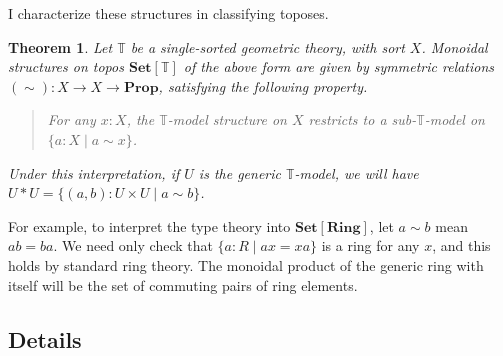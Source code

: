\documentclass{article}
\newtheorem{theorem}{Theorem}[section]
\newcommand*{\Prop}{\mathbf{Prop}}
\newcommand*{\Set}{\mathbf{Set}}
\newcommand*{\Ring}{\mathbf{Ring}}
\newcommand*{\T}{\mathbb{T}}
\begin{document}
I characterize these structures in classifying toposes.

\begin{theorem}
    Let \(\T\) be a single-sorted geometric theory, with sort \(X\).
    Monoidal structures on topos \(\Set[\T]\) of the above form 
    are given by symmetric relations \((\sim) : X \to X \to \Prop\),
    satisfying the following property.
    \begin{quote}
        For any \(x : X\), the \(\T\)-model structure on \(X\)
        restricts to a sub-\(\T\)-model on \(\{a : X \mid a \sim x\}\).
    \end{quote}

    Under this interpretation, if \(U\) is the generic \(\T\)-model,
    we will have \(U*U = \{(a,b) : U \times U \mid a \sim b\}\).
\end{theorem}

\noindent For example, to interpret the type theory into \(\Set[\Ring]\), let \(a \sim b\) mean \(ab = ba\).
We need only check that \(\{a : R \mid ax = xa\}\) is a ring for any \(x\), and this holds by standard ring theory.
The monoidal product of the generic ring with itself will be the set of commuting pairs of ring elements.



\subsection{Details} \label{Details}
\end{document}
